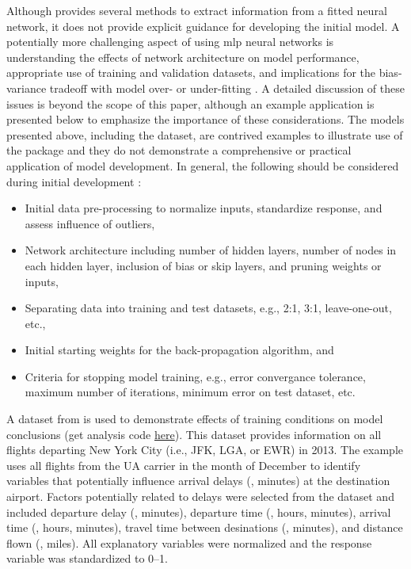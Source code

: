 \documentclass[article,shortnames]{jss}
\begin{document}
Although  provides several methods to extract information from a fitted neural network, it does not provide explicit guidance for developing the initial model.  A potentially more challenging aspect of using \ac{mlp} neural networks is understanding the effects of network architecture on model performance, appropriate use of training and validation datasets, and implications for the bias-variance tradeoff with model over- or under-fitting \citep{Maier00}.  A detailed discussion of these issues is beyond the scope of this paper, although an example application is presented below to emphasize the importance of these considerations.  The models presented above, including the  dataset, are contrived examples to illustrate use of the  package and they do not demonstrate a comprehensive or practical application of model development.  In general, the following should be considered during initial development \citep{Ripley96, Lek00, Maier00}:
\begin{itemize}
\item Initial data pre-processing to normalize inputs, standardize response, and assess influence of outliers,
\item Network architecture including number of hidden layers, number of nodes in each hidden layer, inclusion of bias or skip layers, and pruning weights or inputs,
\item Separating data into training and test datasets, e.g., 2:1, 3:1, leave-one-out, etc., 
\item Initial starting weights for the back-propagation algorithm, and
\item Criteria for stopping model training, e.g., error convergance tolerance, maximum number of iterations, minimum error on test dataset, etc.
\end{itemize}

A dataset from  \citep{Wickham14b} is used to demonstrate effects of training conditions on model conclusions (get analysis code \href{https://raw.githubusercontent.com/fawda123/nnt_manu/master/flightimp.R}{here}).  This dataset provides information on all flights departing New York City (i.e., JFK, LGA, or EWR) in 2013.  The example uses all flights from the UA carrier in the month of December to identify variables that potentially influence arrival delays (, minutes) at the destination airport.  Factors potentially related to delays were selected from the dataset and included departure delay (, minutes), departure time (, hours, minutes), arrival time (, hours, minutes), travel time between desinations (, minutes), and distance flown (, miles).  All explanatory variables were normalized and the response variable was standardized to 0--1.
\end{document}
